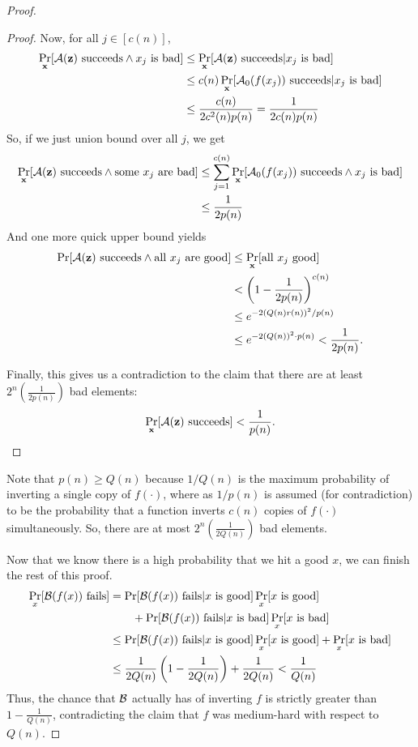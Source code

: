 \begin{proof}
\begin{proof}
		Now, for all $j \in [c(n)]$,
		\begin{align*}
		\Pr_{\mathbf x}[\mathcal{A}(\mathbf z) \mbox{ succeeds} \land x_j\mbox{ is bad}] &\le \Pr_{\mathbf x}[\mathcal{A}(\mathbf z) \mbox{ succeeds} |  x_j\mbox{ is bad}]\\
		&\le c(n) \Pr_{\mathbf x}[\mathcal{A}_0(f(x_j))\mbox{ succeeds} | x_j\mbox{ is bad}]\\
		&\le \frac{c(n)}{2c^2(n)p(n)} = \frac{1}{2c(n)p(n)}
		\end{align*}
		So, if we just union bound over all $j$, we get
		\begin{align*}
		\Pr_{\mathbf x}[\mathcal{A}(\mathbf z) \mbox{ succeeds} \land \mbox{some } x_j \mbox{ are bad}] &\le \sum_{j = 1}^{c(n)} \Pr_{\mathbf x}[\mathcal{A}_0(f(x_j))\mbox{ succeeds} \land x_j\mbox{ is bad}]\\
		&\le \frac{1}{2p(n)}
		\end{align*}
		And one more quick upper bound yields
		\begin{align*}
	\Pr[\mathcal{A}(\mathbf z) \mbox{ succeeds} \land \mbox{all } x_j \mbox{ are good}] &\le \Pr_{\mathbf x}[\mbox{all $x_j$ good}]\\
	&< \left(1 - \frac{1}{2p(n)}\right)^{c(n)}\\
	&\leq e^{-2\left(Q(n)r(n)\right)^2 / p(n)}\\
	&\leq e^{- 2\left(Q(n)\right)^2 \cdot p(n)} < \frac 1 {2p(n)}.
		\end{align*}
		
		Finally, this gives us a contradiction to the claim that there are at least $2^n(\frac{1}{2p(n)})$ bad elements:
		\begin{align*}
		\Pr_{\mathbf x}[\mathcal{A}(\mathbf z) \mbox{ succeeds}] < \frac{1}{p(n)}.
		\end{align*}
	\end{proof}

	Note that $p(n)\geq Q(n)$ because $1/Q(n)$ is the maximum probability of inverting a single copy of $f(\cdot)$, where as $1/p(n)$ is assumed (for contradiction) to be the probability that a function inverts $c(n)$ copies of $f(\cdot)$ simultaneously. So, there are at most $2^n(\frac{1}{2Q(n)})$ bad elements.

	Now that we know there is a high probability that we hit a good $x$, we can finish the rest of this proof.
	\begin{align*}
	\Pr_{x}[{\cal B}(f(x)) \mbox{ fails}] &= \Pr[{\cal B}(f(x)) \mbox{ fails} | x \mbox{ is good}] \Pr_x[x \mbox{ is good}]\\
	&\qquad + \Pr[{\cal B}(f(x)) \mbox{ fails} | x \mbox{ is bad}] \Pr_x[x \mbox{ is bad}]\\
	&\le\Pr[{\cal B}(f(x)) \mbox{ fails} | x \mbox{ is good}] \Pr_x[x \mbox{ is good}] + \Pr_x[x \mbox{ is bad}]\\
	&\le \frac{1}{2Q(n)}\left(1 - \frac 1 {2Q(n)}\right) + \frac{1}{2Q(n)} < \frac 1 {Q(n)}
	\end{align*}
	Thus, the chance that ${\cal B}$ actually has of inverting $f$ is strictly greater than $1 - \frac 1 {Q(n)}$, contradicting the claim that $f$ was medium-hard with respect to $Q(n)$.
\end{proof}

